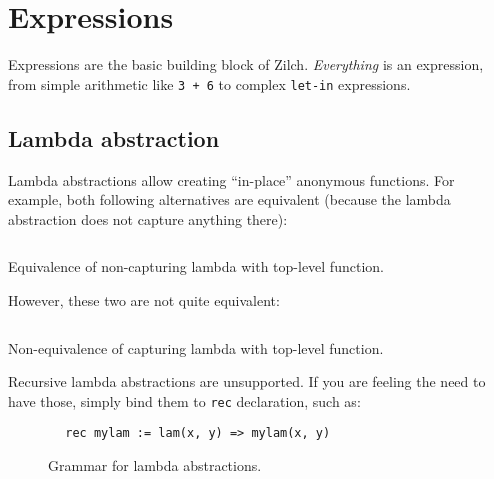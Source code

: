 \section{Expressions}\label{sec:zilch-grammar-expressions}

Expressions are the basic building block of Zilch.
\textit{Everything} is an expression, from simple arithmetic like \texttt{3 + 6} to complex \texttt{let-in} expressions.

\subsection{Lambda abstraction}\label{subsec:zilch-grammar-expressions-lambda}

Lambda abstractions allow creating ``in-place'' anonymous functions.
For example, both following alternatives are equivalent (because the lambda abstraction does not capture anything there):
\begin{listing}[H]
	\inputminted{\zilchlexer}{examples/captureless-lambda-equivalence.zc}

	\captionsetup{style=invisible}
	\caption{Equivalence of non-capturing lambda with top-level function.}
\end{listing}
\vspace*{-\baselineskip}

\noindent However, these two are not quite equivalent:
\begin{listing}[H]
	\inputminted{\zilchlexer}{examples/closure-non-equivalence.zc}

	\captionsetup{style=invisible}
	\caption{Non-equivalence of capturing lambda with top-level function.}
\end{listing}
\vspace*{-\baselineskip}

\begin{infobox}
	Recursive lambda abstractions are unsupported.
	If you are feeling the need to have those, simply bind them to \texttt{rec} declaration, such as:
	\vspace*{\baselineskip}

	\begin{verbatim}
		rec mylam := lam(x, y) => mylam(x, y)
  \end{verbatim}
\end{infobox}

\begin{figure}[H]
	\centering


	\caption{Grammar for lambda abstractions.}
	\label{fig:zilch-gramma-expressions-lambda-grammar}
\end{figure}

